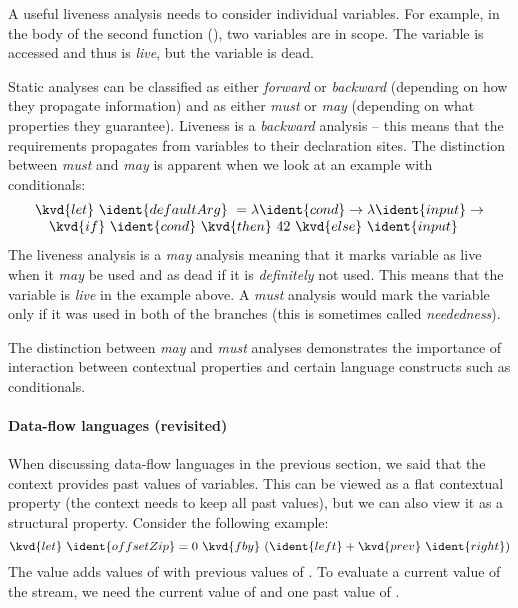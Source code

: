 A useful liveness analysis needs to consider individual variables. For example, in the body of
the second function (), two variables are in scope. The variable  is
accessed and thus is \emph{live}, but the variable  is dead.

Static analyses can be classified as either \emph{forward} or \emph{backward} (depending on how they 
propagate information) and as either \emph{must} or \emph{may} (depending on what properties they
guarantee). Liveness is a \emph{backward} analysis -- this means that the requirements propagates
from variables to their declaration sites. The distinction between \emph{must} and \emph{may} is 
apparent when we look at an example with conditionals:
%
\begin{equation*}
\begin{array}{l}
\kvd{let}~\ident{defaultArg}~= \lambda \ident{cond} \rightarrow \lambda \ident{input} \rightarrow\\
\quad\kvd{if}~\ident{cond}~\kvd{then}~42~\kvd{else}~\ident{input}
\end{array}
\end{equation*}
%
The liveness analysis is a \emph{may} analysis meaning that it marks variable as live when it
\emph{may} be used and as dead if it is \emph{definitely} not used. This means that the variable
 is \emph{live} in the example above. A \emph{must} analysis would mark the variable
only if it was used in both of the branches (this is sometimes called \emph{neededness}).

The distinction between \emph{may} and \emph{must} analyses demonstrates the importance of 
interaction between contextual properties and certain language constructs such as conditionals.


\paragraph{Data-flow languages (revisited)}
When discussing data-flow languages in the previous section, we said that the context provides 
past values of variables. This can be viewed as a flat contextual property (the context needs
to keep all past values), but we can also view it as a structural property. Consider the following
example:
%
\begin{equation*}
\kvd{let}~\ident{offsetZip} = 0~\kvd{fby}~(\ident{left} + \kvd{prev}~\ident{right})
\end{equation*}
%
The value  adds values of  with previous values of .
To evaluate a current value of the stream, we need the current value of  and one past
value of . 

